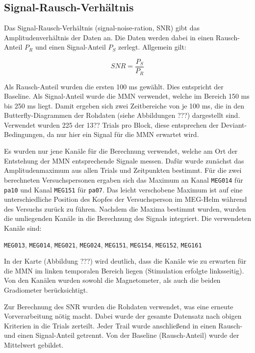 \documentclass[doc,a4paper,12pt]{apa6}
\begin{document}
\subsection{Signal-Rausch-Verhältnis}
\label{sec:snr}

Das Signal-Rausch-Verhältnis (signal-noise-ration, SNR) gibt das Amplitudenverhältnis der Daten an. Die Daten werden dabei in einen Rausch-Anteil $P_R$ und einen Signal-Anteil $P_S$ zerlegt. Allgemein gilt:

\begin{equation}
SNR = \frac{P_S}{P_R}
\end{equation}

Als Rausch-Anteil wurden die ersten 100 ms gewählt. Dies entspricht der Baseline. Als Signal-Anteil wurde die MMN verwendet, welche im Bereich 150 ms bis 250 ms liegt. Damit ergeben sich zwei Zeitbereiche von je 100 ms, die in den Butterfly-Diagrammen der Rohdaten (siehe Abbildungen ???) dargestellt sind. Verwendet wurden 225 der 13?? Trials pro Block, diese entsprechen der Deviant-Bedingungen, da nur hier ein Signal für die MMN erwartet wird.

Es wurden nur jene Kanäle für die Berechnung verwendet, welche am Ort der Entstehung der MMN entsprechende Signale messen. Dafür wurde zunächst das Amplitudenmaximum aus allen Trials und Zeitpunkten bestimmt. Für die zwei berechneten Versuchspersonen ergaben sich das Maximum an Kanal \texttt{MEG014} für \texttt{pa10} und Kanal \texttt{MEG151} für \texttt{pa07}. Das leicht verschobene Maximum ist auf eine unterschiedliche Position des Kopfes der Versuchsperson im MEG-Helm während des Versuchs zurück zu führen. Nachdem die Maxima bestimmt wurden, wurden die umliegenden Kanäle in die Berechnung des Signals integriert. Die verwendeten Kanäle sind:

\texttt{MEG013}, \texttt{MEG014}, \texttt{MEG021}, \texttt{MEG024}, \texttt{MEG151}, \texttt{MEG154}, \texttt{MEG152}, \texttt{MEG161}

In der Karte (Abbildung ???) wird deutlich, dass die Kanäle wie zu erwarten für die MMN im linken temporalen Bereich liegen (Stimulation erfolgte linksseitig). Von den Kanälen wurden sowohl die Magnetometer, als auch die beiden Gradiometer berücksichtigt.

Zur Berechnung des SNR wurden die Rohdaten verwendet, was eine erneute Vorverarbeitung nötig macht. Dabei wurde der gesamte Datensatz nach obigen Kriterien in die Trials zerteilt. Jeder Trail wurde anschließend in einen Rausch- und einen Signal-Anteil getrennt. Von der Baseline (Rausch-Anteil) wurde der Mittelwert gebildet.
\end{document}
